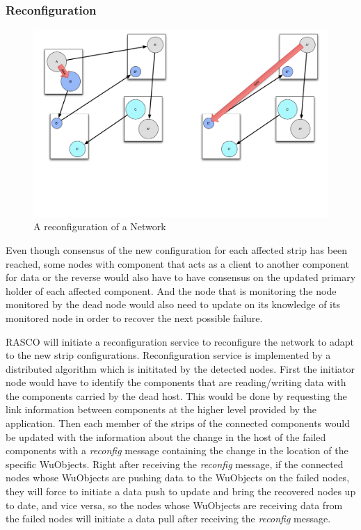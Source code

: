 \subsubsection{Reconfiguration}
\label{s:reconfig}

\begin{figure}[h!]
\caption{A reconfiguration of a Network}
\label{fig:reconfig-network}
\centering
    \includegraphics[width=\linewidth]{figures/reconfig-network}
\end{figure}

Even though consensus of the new configuration for each affected strip has been
reached, some nodes with component that acts as a client to another component
for data or the reverse would also have to have consensus on the updated
primary holder of each affected component. And the node that is monitoring the
node monitored by the dead node would also need to update on its knowledge of
its monitored node in order to recover the next possible failure.

RASCO will initiate a reconfiguration service to reconfigure the network to adapt
to the new strip configurations. Reconfiguration service is implemented by
a distributed algorithm which is inititated by the detected nodes. First the
initiator node would have to identify the components that are reading/writing
data with the components carried by the dead host. This would be done by
requesting the link information between components at the higher level provided
by the application. Then each member of the strips of the connected components
would be updated with the information about the change in the host of the
failed components with a \emph{reconfig} message containing the change in the
location of the specific WuObjects. Right after receiving the \emph{reconfig}
message, if the connected nodes whose WuObjects are pushing data to the
WuObjects on the failed nodes, they will force to initiate a data push to
update and bring the recovered nodes up to date, and vice versa, so the nodes
whose WuObjects are receiving data from the failed nodes will initiate a data
pull after receiving the \emph{reconfig} message.

